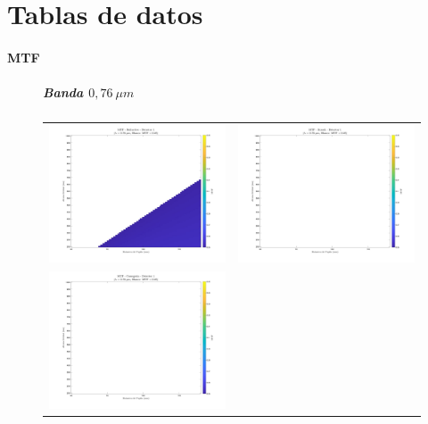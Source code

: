 \chapter{Tablas de datos}
\minitoc

\subsubsection{MTF}



\begin{landscape}
\begin{figure}[p]
\centering
\setlength{\tabcolsep}{2pt}
\renewcommand{\arraystretch}{0}
\paragraph{Banda $0,76\ \mu m$}
\begin{tabular}{cc}
\includegraphics[width=0.48\linewidth]{4.Payload/MTF/MTF_Lambda3_Detector4_Telescopio1_heatmap.jpg} &
\includegraphics[width=0.48\linewidth]{4.Payload/MTF/MTF_Lambda3_Detector4_Telescopio2_heatmap.jpg} \\
\includegraphics[width=0.48\linewidth]{4.Payload/MTF/MTF_Lambda3_Detector4_Telescopio3_heatmap.jpg} &

\end{tabular}
\end{figure}
\end{landscape}
